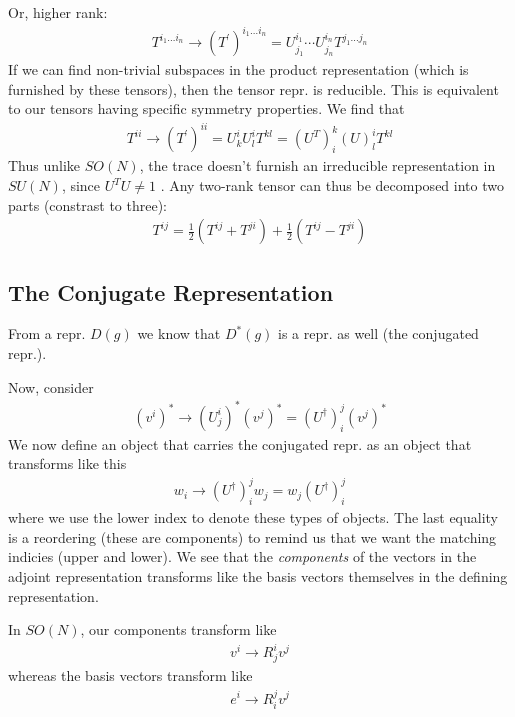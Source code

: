 Or, higher rank: \begin{align*}
    T^{i_1 \dots i_n} \to \left( T^{\prime}  \right) ^{i_1 \dots i_n} = U^{i_1} _ {j_1} \cdots U^{i_n} _ {j_n} T^{j_1 \dots j_n}
\end{align*}
If we can find non-trivial subspaces in the product representation (which is furnished by these tensors), then the tensor repr. is reducible. This is equivalent to our tensors having specific symmetry properties. We find that \begin{align*}
    T^{ii} \to \left( T^{\prime}  \right) ^{ii} = U^i _k U^i _l T^{k l} = \left( U^T \right) ^k _i \left( U \right) ^i _ l T^{kl} 
\end{align*}
Thus unlike \(SO(N)\), the trace doesn't furnish an irreducible representation in \(SU(N)\), since \(U^T U \neq 1\) . Any two-rank tensor can thus be decomposed into two parts (constrast to three):
\begin{align*}
    T^{ij} = \frac{1}{2}\left( T^{ij} + T^{ji}  \right) + \frac{1}{2} \left( T^{ij} - T^{ji}   \right) 
\end{align*}

\subsection{The Conjugate Representation}
From a repr. \(D(g)\) we know that \(D^{\ast} (g)\) is a repr. as well (the conjugated repr.).

Now, consider \begin{align*}
 \left( v^i \right) ^{\ast} \to \left( U ^i _j \right)^{\ast} \left( v^j \right)^{\ast} = \left( U^{\dagger}  \right) ^j _i  \left( v^j \right) ^{\ast} 
\end{align*}
We now define an object that carries the conjugated repr. as an object that transforms like this \begin{align*}
    w_i \to \left( U^{\dagger}  \right) ^j _i w_j = w_j \left( U ^{\dagger}  \right) ^j _i
\end{align*}
where we use the lower index to denote these types of objects. The last equality is a reordering (these are components) to remind us that we want the matching indicies (upper and lower). We see that the \textit{components} of the vectors in the adjoint representation transforms like the basis vectors themselves in the defining representation. 

In \(SO(N)\), our components transform like \begin{align*}
    v^i \to R^i _j v^j
\end{align*}
whereas the basis vectors transform like \begin{align*}
    e^i \to R^j _ i v^j
\end{align*}

